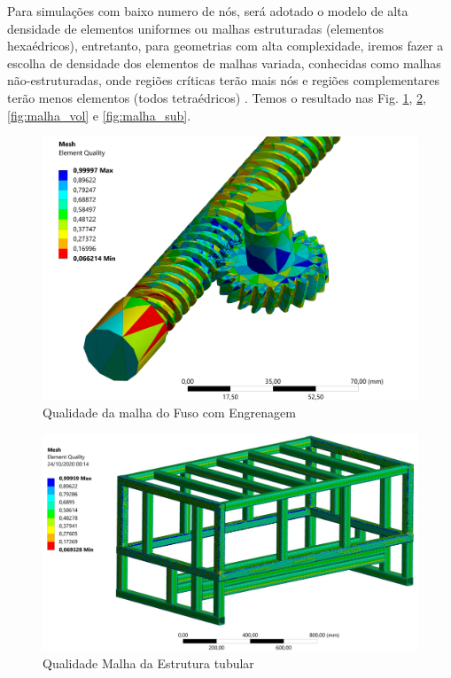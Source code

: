 Para simulações com baixo numero de nós, será adotado o modelo de alta densidade de elementos uniformes ou malhas estruturadas (elementos hexaédricos), entretanto, para geometrias com alta complexidade, iremos fazer a escolha de densidade dos elementos de malhas variada, conhecidas como malhas não-estruturadas, onde regiões críticas terão mais nós e regiões complementares terão menos elementos (todos tetraédricos) \cite{malha}. Temos o resultado nas Fig. \ref{fig:Malha_eng}, \ref{fig:malha_carc}, \ref{fig:malha_vol} e \ref{fig:malha_sub}.

\begin{figure}[ht]
        \centering
        \includegraphics[width=.9\textwidth]{figuras/estrutura/Imagens PC3/Malhas/fuso engrenagem qualidade.png}
        \caption{Qualidade da malha do Fuso com Engrenagem}
        \label{fig:Malha_eng}
    \end{figure}
    
\begin{figure}[H]
        \centering
        \includegraphics[width=1\textwidth]{figuras/estrutura/Imagens PC3/Malhas/estrutura tubular mesh.png}
        \caption{Qualidade Malha da Estrutura tubular}
        \label{fig:malha_carc}
    \end{figure} 
    
